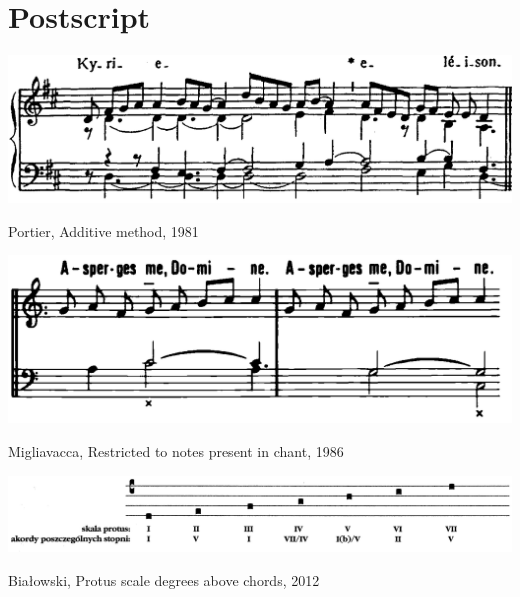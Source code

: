 \clearpage
\section{Postscript}

\vspace*{\fill}

\begin{example}
  \centering
  \includegraphics[width=.8\linewidth]{c/6/ex/portier_ictus.png}
  \caption{Portier, Additive method, 1981}
  \label{mus:portier_ictus_16}
\end{example}

\vspace*{\fill}

\begin{example}
  \centering
  \includegraphics[width=.8\linewidth]{c/6/ex/migliavacca.png}
  \caption{Migliavacca, Restricted to notes present in chant, 1986}
  \label{mus:migliavacca}
\end{example}

\vspace*{\fill}

\newpage

\vspace*{\fill}

\begin{example}
  \centering
  \includegraphics[width=.9\linewidth]{c/6/ex/bialowski_scale.png}
  \caption{Białowski, Protus scale degrees above chords, 2012}
  \label{mus:bialowski_scale}
\end{example}

\vspace*{\fill}

